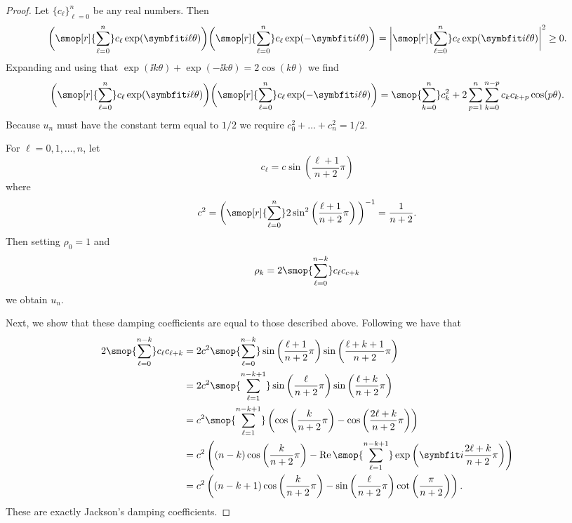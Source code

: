 \begin{proof}
    Let \( \{ c_\ell \}_{\ell=0}^{n} \) be any real numbers. 
    Then 
    \begin{equation*}
        \bigg( \smop[r]{\sum_{\ell=0}^{n}} c_\ell \exp( \ii \ell \theta) \bigg)
        \bigg( \smop[r]{\sum_{\ell=0}^{n}} c_\ell \exp( - \ii \ell \theta) \bigg)
        =
        \bigg| \smop[r]{\sum_{\ell=0}^{n}} c_\ell \exp( \ii \ell \theta) \bigg|^2
        \geq 0.
    \end{equation*}
    Expanding and using that \( \exp(\ii k \theta) + \exp(-\ii k \theta) = 2\cos(k\theta) \) we find
    \begin{equation*}
        \bigg( \smop[r]{\sum_{\ell=0}^{n}} c_\ell \exp( \ii \ell  \theta) \bigg)
        \bigg( \smop[r]{\sum_{\ell=0}^{n}} c_\ell \exp( - \ii \ell \theta) \bigg)
        = \smop{\sum_{k=0}^{n}} c_k^2 
        + 2\sum_{p=1}^{n} \sum_{k=0}^{n-p} c_k c_{k+p} \cos(p\theta). 
    \end{equation*}
    Because \( u_n \) must have the constant term equal to \( 1/2 \) we require \( c_0^2 + \ldots + c_n^2 = 1/2 \).

    For \( \ell = 0,1,\ldots, n \), let
    \begin{equation*}
        c_\ell = c \sin \left( \frac{\ell+1}{n+2} \pi \right)
    \end{equation*}
    where
    \begin{equation*}
        c^2 = \bigg( \smop[r]{\sum\limits_{\ell=0}^{n}} 2\sin^2 \left( \frac{\ell+1}{n+2} \pi \right) \bigg)^{-1}
        = \frac{1}{n+2}.
    \end{equation*}
    Then setting \( \rho_0 = 1 \) and 
    \begin{equation*}
        \rho_k = 2 \smop{\sum_{\ell=0}^{n-k}} c_\ell c_{c+k}
    \end{equation*}
    we obtain \( u_n \).

    Next, we show that these damping coefficients are equal to those described above. 
    Following \cite{weisse_wellein_alvermann_fehske_06} we have that
    \begin{align*}
        2 \smop{\sum_{\ell=0}^{n-k}} c_\ell c_{\ell+k}
        &= 2 c^2 \smop{\sum_{\ell=0}^{n-k}} \sin\left( \frac{\ell+1}{n+2} \pi \right) \sin \left( \frac{\ell+k+1}{n+2}\pi \right)
        \\&= 2 c^2 \smop{\sum_{\ell=1}^{n-k+1}} \sin\left( \frac{\ell}{n+2} \pi \right) \sin \left( \frac{\ell+k}{n+2}\pi \right)
        \\&= c^2 \smop{\sum_{\ell=1}^{n-k+1}} \left( \cos\left( \frac{k}{n+2} \pi \right) - \cos \left( \frac{2\ell+k}{n+2}\pi \right) \right)
        \\&= c^2 \left( (n-k) \cos\left( \frac{k}{n+2} \pi \right) 
             - \Re \smop{\sum_{\ell=1}^{n-k+1}} \exp\left(\ii \frac{2\ell+k}{n+2}\pi \right) \right)
        \\&= c^2 \left( (n-k+1) \cos\left( \frac{k}{n+2} \pi \right) 
             - \sin \left( \frac{\ell}{n+2}\pi \right) \cot \left( \frac{\pi}{n+2} \right) \right).
    \end{align*}
    These are exactly Jackson's damping coefficients.


\end{proof}

